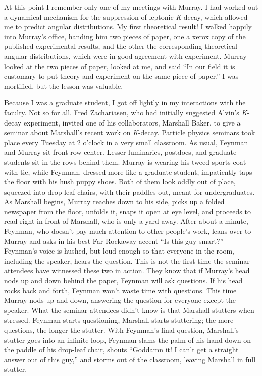 \documentclass[12pt]{article}
\begin{document}
At this point I remember only one of my meetings with Murray. I had worked out a dynamical mechanism for the suppression of leptonic {\it K} decay, which allowed me to predict angular distributions. My first theoretical result! I walked happily into Murray's office, handing him two pieces of paper, one a xerox copy of the published experimental results, and the other the corresponding theoretical angular distributions, which were in good agreement with experiment. Murray looked at the two pieces of paper, looked at me, and said ``In our field it is customary to put theory and experiment on the same piece of paper.'' I was mortified, but the lesson was valuable.

Because I was a graduate student, I got off lightly in my interactions with the faculty. Not so for all. Fred Zachariasen, who had initially suggested Alvin's {\it K}-decay experiment, invited one of his collaborators, Marshall Baker, to give a seminar about Marshall's recent work on {\it K}-decay. Particle physics seminars took place every Tuesday at 2 o'clock in a very small classroom.
As usual, Feynman and Murray sit front row center.  Lesser luminaries, postdocs, and graduate students sit in the rows behind them. Murray is wearing his tweed sports coat with tie, while Feynman, dressed more like a graduate student, impatiently taps the floor with his hush puppy shoes. Both of them look oddly out of place, squeezed into drop-leaf chairs, with their paddles out, meant for undergraduates. As Marshall begins, Murray reaches down to his side, picks up a folded newspaper from the floor, unfolds it, snaps it open at eye level, and proceeds to read right in front of Marshall, who is only a yard away. After about a minute, Feynman, who doesn't pay much attention to other people's work,  leans over to Murray and asks in his best Far Rockaway accent ``Is this guy smart?'' Feynman's voice is hushed, but loud enough so that everyone in the room, including the speaker, hears the question. This is not the first time the seminar attendees have witnessed these two in action. They know that if Murray's head nods up and down behind the paper, Feynman will ask questions. If his head rocks back and forth, Feynman won't waste time with questions. This time Murray nods up and down, answering the question for everyone except the speaker. What the seminar attendees didn't know is that Marshall stutters when stressed. Feynman starts questioning, Marshall starts stuttering; the more questions, the longer the stutter. With Feynman's final question, Marshall's stutter goes into an infinite loop, Feynman slams the palm of his hand down on the paddle of his drop-leaf chair, shouts ``Goddamn it! I can't get a straight answer out of this guy,'' and storms out of the classroom, leaving Marshall in full stutter.
\end{document}

